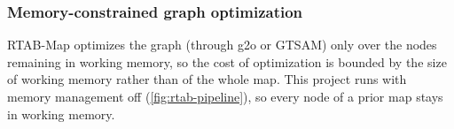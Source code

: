 \subsubsection{Memory-constrained graph optimization}

RTAB-Map optimizes the graph (through g2o or GTSAM) only over the nodes
remaining in working memory, so the cost of optimization is bounded by the size
of working memory rather than of the whole map. This project runs with memory
management off (\cref{fig:rtab-pipeline}), so every node of a prior map stays
in working memory.
